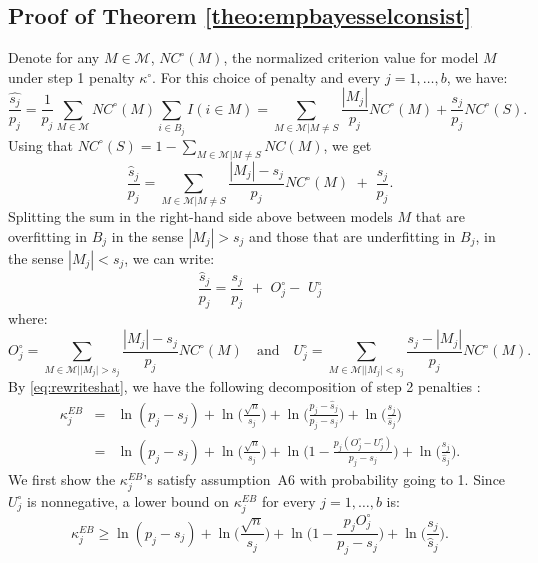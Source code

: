 \documentclass[aos]{imsart}
\theoremstyle{plain}
\newcommand{\M}{\mathcal{M}}
\begin{document}
\subsection{Proof of Theorem \ref{theo:empbayesselconsist}}
Denote for any $M\in\M$, $NC^{\circ}(M)$, the normalized criterion value for model $M$ under step 1 penalty $\kappa^{\circ}$. For this choice of penalty and every $j=1,\ldots,b$, we have:
\begin{equation*}
    \frac{\widehat{s_j}}{p_j}
   = \frac{1}{p_j}\sum_{M \in \M}NC^{\circ}(M)\sum_{i \in B_j}I(i\in M) =\sum_{M \in \M | M \neq S}\frac{|M_j|}{p_j}NC^{\circ}(M) +\frac{s_j}{p_j}NC^{\circ}(S) .
\end{equation*}
Using that $NC^{\circ}(S)=1-\sum_{M \in \M | M \neq S}NC(M)$, we get
\begin{equation*}
   \frac{\widehat{s}_j}{p_j}
   =\sum_{M \in \M | M \neq S}\frac{|M_j|-s_j}{p_j}NC^{\circ}(M) \,\,+\,\, \frac{s_j}{p_j}.
\end{equation*}
Splitting the sum in the right-hand side above between models $M$ that are overfitting in $B_j$ in the sense $|M_j|> s_j$ and those that are underfitting in $B_j$, in the sense $|M_j|<s_j$, we can write:
\begin{equation}\label{eq:rewriteshat}
  \frac{\widehat{s}_j}{p_j}  = \frac{s_j}{p_j}\,\,+\,\, O_j^{\circ}-\,\,U_j^{\circ}
\end{equation}
where:
$$
    O_j^{\circ} = \sum_{M \in \M | |M_j| > s_j}\frac{|M_j|-s_j}{p_j}NC^{\circ}(M)\quad\text{and}\quad
    U_j^{\circ} = \sum_{M \in \M | |M_j| < s_j}\frac{s_j-|M_j|}{p_j}NC^{\circ}(M).
$$
By \eqref{eq:rewriteshat}, we have the following decomposition of step 2 penalties :
\begin{eqnarray}\label{eq:decompstep2pen}
    \kappa^{EB}_j
    &=& \ln(p_j-s_j) + \ln\Big(\frac{\sqrt{n}}{s_j}\Big) + \ln\Big(\frac{p_j-\widehat{s}_j}{p_j-s_j}\Big) + \ln\Big(\frac{s_j}{\widehat{s}_j}\Big) \nonumber\\
    &=& \ln(p_j-s_j)+\ln\Big(\frac{\sqrt{n}}{s_j}\Big)+\ln\Big(1-\frac{p_j(O^{\circ}_j-U^{\circ}_j)}{p_j-s_j}\Big)+\ln\Big(\frac{s_j}{\widehat{s}_j}\Big).
\end{eqnarray}
We first show the $\kappa^{EB}_j$'s satisfy assumption~A6 with probability going to 1. Since $U_j^{\circ}$ is nonnegative, a lower bound on $\kappa^{EB}_j$ for every $j=1,\ldots,b$ is:
\begin{equation}\label{eq:decompstep2pen2}
    \kappa^{EB}_j
    \geq  \ln(p_j-s_j)+\ln\Big(\frac{\sqrt{n}}{s_j}\Big)+\ln\Big(1-\frac{p_j O^{\circ}_j}{p_j-s_j}\Big)+\ln\Big(\frac{s_j}{\widehat{s}_j}\Big).
\end{equation}
\end{document}
